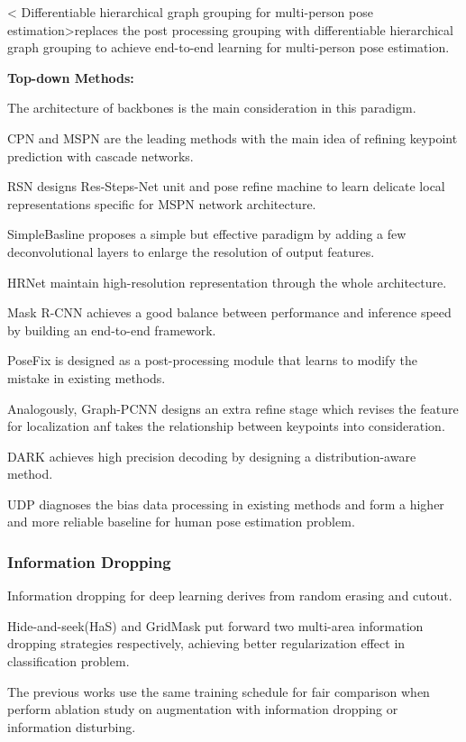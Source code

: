 \documentclass[11pt]{article}
\begin{document}
< Differentiable hierarchical graph grouping for multi-person pose estimation>replaces the post processing grouping with differentiable hierarchical graph grouping to achieve end-to-end learning for multi-person pose estimation.

\textbf{Top-down Methods:}

The architecture of backbones is the main consideration in this paradigm.

CPN and MSPN are the leading methods with the main idea of refining keypoint prediction with cascade networks.

RSN designs Res-Steps-Net unit and pose refine machine to learn delicate local representations specific for MSPN network architecture.

SimpleBasline proposes a simple but effective paradigm by adding a few deconvolutional layers to enlarge the resolution of output features.

HRNet maintain high-resolution representation through the whole architecture.

Mask R-CNN achieves a good balance between performance and inference speed by building an end-to-end framework.

PoseFix is designed as a post-processing module that learns to modify the mistake in existing methods.

Analogously, Graph-PCNN designs an extra refine stage which revises the feature for localization anf takes the relationship between keypoints into consideration.

DARK achieves high precision decoding by designing a distribution-aware method.

UDP diagnoses the bias data processing in existing methods and form a higher and more reliable baseline for human pose estimation problem.

\subsubsection{Information Dropping}
Information dropping for deep learning derives from random erasing and cutout.

Hide-and-seek(HaS) and GridMask put forward two multi-area information dropping strategies respectively, achieving better regularization effect in classification problem.

The previous works use the same training schedule for fair comparison when perform ablation study on augmentation with information dropping or information disturbing.
\end{document}
